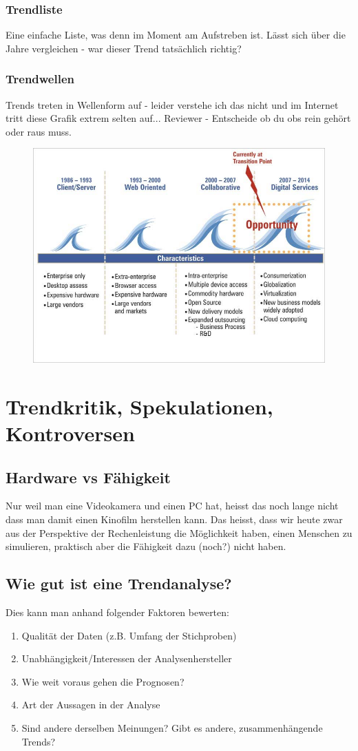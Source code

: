 \subsubsection{Trendliste}
Eine einfache Liste, was denn im Moment am Aufstreben ist. Lässt sich über die Jahre vergleichen - war dieser Trend tatsächlich richtig?
\subsubsection{Trendwellen}
Trends treten in Wellenform auf - leider verstehe ich das nicht und im Internet tritt diese Grafik extrem selten auf...
Reviewer - Entscheide ob du obs rein gehört oder raus muss.
\begin{figure}
\centering
\includegraphics[width=0.7\linewidth]{fig/waves}
\caption{}
\label{fig:waves}
\end{figure}

\section{Trendkritik, Spekulationen, Kontroversen}
\subsection{Hardware vs Fähigkeit}
Nur weil man eine Videokamera und einen PC hat, heisst das noch lange nicht dass man damit einen Kinofilm herstellen kann. Das heisst, dass wir heute zwar aus der Perspektive der Rechenleistung die Möglichkeit haben, einen Menschen zu simulieren, praktisch aber die Fähigkeit dazu (noch?) nicht haben.
\subsection{Wie gut ist eine Trendanalyse?}
Dies kann man anhand folgender Faktoren bewerten:
\begin{enumerate}
	\item Qualität der Daten (z.B. Umfang der Stichproben)
	\item Unabhängigkeit/Interessen der Analysenhersteller
	\item Wie weit voraus gehen die Prognosen?
	\item Art der Aussagen in der Analyse
	\item Sind andere derselben Meinungen? Gibt es andere, zusammenhängende Trends?
\end{enumerate}

